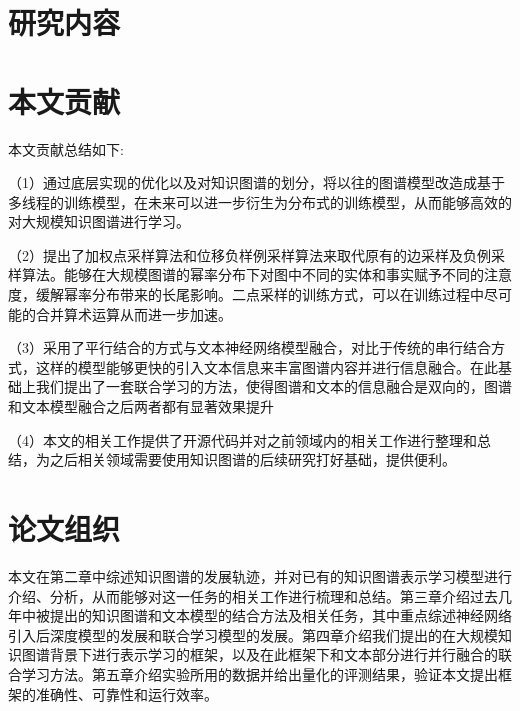 \section{研究内容}

\section{本文贡献}

  本文贡献总结如下:

  （1）通过底层实现的优化以及对知识图谱的划分，将以往的图谱模型改造成基于多线程的训练模型，在未来可以进一步衍生为分布式的训练模型，从而能够高效的对大规模知识图谱进行学习。
  
  （2）提出了加权点采样算法和位移负样例采样算法来取代原有的边采样及负例采样算法。能够在大规模图谱的幂率分布下对图中不同的实体和事实赋予不同的注意度，缓解幂率分布带来的长尾影响。二点采样的训练方式，可以在训练过程中尽可能的合并算术运算从而进一步加速。
  
  （3）采用了平行结合的方式与文本神经网络模型融合，对比于传统的串行结合方式，这样的模型能够更快的引入文本信息来丰富图谱内容并进行信息融合。在此基础上我们提出了一套联合学习的方法，使得图谱和文本的信息融合是双向的，图谱和文本模型融合之后两者都有显著效果提升
  
  （4）本文的相关工作提供了开源代码并对之前领域内的相关工作进行整理和总结，为之后相关领域需要使用知识图谱的后续研究打好基础，提供便利。

\section{论文组织}

  本文在第二章中综述知识图谱的发展轨迹，并对已有的知识图谱表示学习模型进行介绍、分析，从而能够对这一任务的相关工作进行梳理和总结。第三章介绍过去几年中被提出的知识图谱和文本模型的结合方法及相关任务，其中重点综述神经网络引入后深度模型的发展和联合学习模型的发展。第四章介绍我们提出的在大规模知识图谱背景下进行表示学习的框架，以及在此框架下和文本部分进行并行融合的联合学习方法。第五章介绍实验所用的数据并给出量化的评测结果，验证本文提出框架的准确性、可靠性和运行效率。
